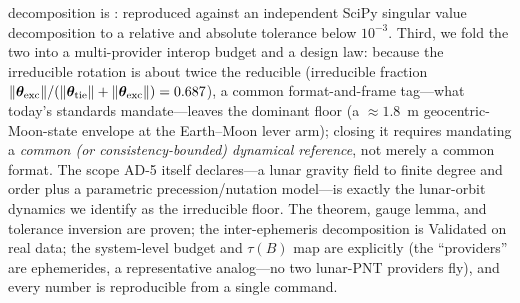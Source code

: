 decomposition is \Validated{}: reproduced against an independent SciPy singular value
decomposition to a relative and absolute tolerance below $10^{-3}$. Third, we fold the
two into a multi-provider interop budget and a design law: because the irreducible
rotation is about twice the reducible (irreducible fraction
$\|\bm{\theta}_{\mathrm{exc}}\|/(\|\bm{\theta}_{\mathrm{tie}}\|+\|\bm{\theta}_{\mathrm{exc}}\|)=0.687$), a
common format-and-frame tag---what today's standards mandate---leaves the dominant
floor (a $\approx\!1.8$~m geocentric-Moon-state envelope at the Earth--Moon lever
arm); closing it requires mandating a \emph{common (or consistency-bounded) dynamical
reference}, not merely a common format. The scope AD-5 itself declares---a lunar
gravity field to finite degree and order plus a parametric precession/nutation
model---is exactly the lunar-orbit dynamics we identify as the irreducible floor. The
theorem, gauge lemma, and tolerance inversion are proven; the inter-ephemeris
decomposition is Validated on real data; the system-level budget and $\tau(B)$ map are
explicitly \Modelled{} (the ``providers'' are ephemerides, a representative
analog---no two lunar-PNT providers fly), and every number is reproducible from a
single command.
